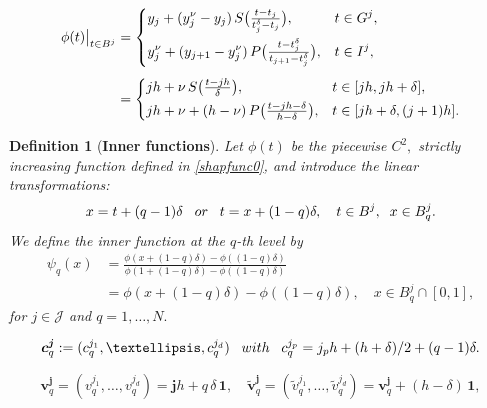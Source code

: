 \documentclass[10pt,a4paper]{amsart}
\newtheorem{definition}{Definition}
\newcommand{\bs}[1]{\boldsymbol{#1}}
\begin{document}
\begin{equation}\label{shapfunc0}
\begin{split}
\phi(t)\big|_{t\in B^j}&=
\begin{dcases}
y_j+(y_j^\nu-y_j)\, S\big(\tfrac{t-t_j}{t_j^\delta-t_j}\big), &t\in G^j,\\
y_j^\nu+(y_{j+1}-y_j^\nu)\,P\big(\tfrac{t-t_j^\delta}{t_{j+1}-t_j^\delta}\big), &t\in I^j,
\end{dcases}\\[4pt]
&=
\begin{dcases}
jh+\nu\, S\big(\tfrac{t-jh}\delta\big), &t\in [jh, jh+\delta],\\
jh+\nu+(h-\nu)\,P\big(\tfrac{t-jh-\delta}{h-\delta}\big), &t\in [jh+\delta, (j+1)h].
\end{dcases}
\end{split}
\end{equation}

\begin{definition}[{\bf Inner functions}]\label{Inner-fun}  \emph{Let $\phi(t)$ be the piecewise $C^2,$ strictly increasing function defined in
\eqref{shapfunc0}, and introduce the linear transformations: \begin{equation}\label{shift-coord}
x=t+(q-1)\delta\;\;\; {\rm or} \;\;\; t=x+(1-q)\delta, \quad  t\in B^j,\;\; x\in B_q^j.
\end{equation} 
We define the inner function  at the $q$-th level by
\begin{equation}\label{PsiqxAS}
\begin{split}
\psi_q(x)& =\frac{\phi(x+(1-q)\delta)- \phi((1-q)\delta)} {\phi(1+(1-q)\delta)-\phi((1-q)\delta)}\\[4pt]
&=\phi(x+(1-q)\delta)- \phi((1-q)\delta), \quad  x\in B_q^j\cap [0,1],
\end{split}
\end{equation}
 for $j\in \mathcal J$ and $q=1,\ldots, N.$} 
\end{definition}

\begin{equation}\label{cqjcenter}  \bs c_q^{\bs j}:=(c_q^{j_1},\ldots, c_q^{j_d})\;\;\; {\rm with} \;\;\; c_q^{j_p}=j_ph+(h+\delta)/2+(q-1)\delta.
    \end{equation} 

\begin{equation}\label{lower-corner1}
   {\bs v}_{q}^{\bs j}=( v_q^{j_1},\ldots,  v_q^{j_d})=\bs j h+q\,\delta\,\bs 1,\quad \tilde{\bs v}_{q}^{\bs j}=(\tilde v_q^{j_1},\ldots, \tilde v_q^{j_d})=\bs v_q^{\bs j}+(h-\delta)\,\bs 1,
\end{equation}
\end{document}
